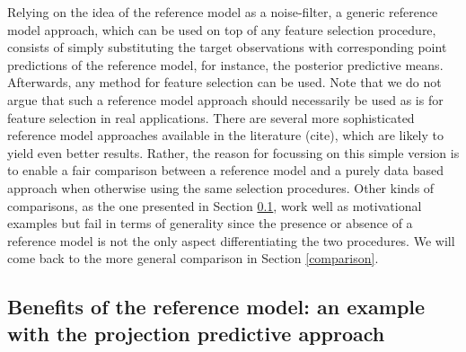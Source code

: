 \documentclass[american,]{article}
\theoremstyle{definition}
\begin{document}

Relying on the idea of the reference model as a noise-filter, a generic reference model approach, which can be used on top of any feature selection procedure, consists of simply substituting the target observations with corresponding point predictions of the reference model, for instance, the posterior predictive means. Afterwards, any method for feature selection can be used. Note that we do not argue that such a reference model approach should necessarily be used as is for feature selection in real applications. There are several more sophisticated reference model approaches available in the literature (cite), which are likely to yield even better results. Rather, the reason for focussing on this simple version is to enable a fair comparison between a reference model and a purely data based approach when otherwise using the same selection procedures. Other kinds of comparisons, as the one presented in Section \ref{projection}, work well as motivational examples but fail in terms of generality since the presence or absence of a reference model is not the only aspect differentiating the two procedures. We will come back to the more general comparison in Section \ref{comparison}.


\hypertarget{projection}{%
\subsection{Benefits of the reference model: an example with the projection predictive approach}\label{projection}}
\end{document}
